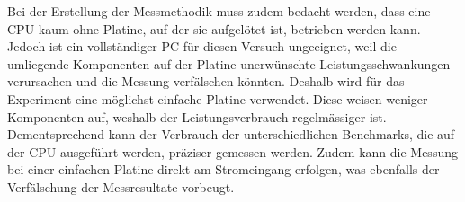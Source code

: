 \par

Bei der Erstellung der Messmethodik muss zudem bedacht werden, dass eine CPU kaum ohne Platine, auf der sie aufgelötet ist, betrieben werden kann. Jedoch ist ein vollständiger PC für diesen Versuch ungeeignet, weil die umliegende Komponenten auf der Platine unerwünschte Leistungsschwankungen verursachen und die Messung verfälschen könnten. Deshalb wird für das Experiment eine möglichst einfache Platine verwendet. Diese weisen weniger Komponenten auf, weshalb der Leistungsverbrauch regelmässiger ist. Dementsprechend kann der Verbrauch der unterschiedlichen Benchmarks, die auf der CPU ausgeführt werden, präziser gemessen werden. Zudem kann die Messung bei einer einfachen Platine direkt am Stromeingang erfolgen, was ebenfalls der Verfälschung der Messresultate vorbeugt.